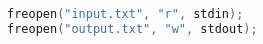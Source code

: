 \begin{lstlisting}[language=C++]
freopen("input.txt", "r", stdin);
freopen("output.txt", "w", stdout);
\end{lstlisting}